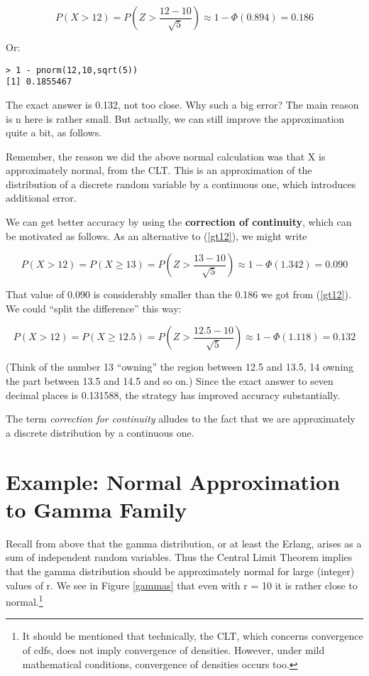 \begin{equation}
\label{gt12}
P(X > 12) = P(Z > \frac{12-10}{\sqrt{5}}) 
\approx 1 - \Phi(0.894) = 0.186
\end{equation}

Or:

\begin{Verbatim}[fontsize=\relsize{-2}]
> 1 - pnorm(12,10,sqrt(5))
[1] 0.1855467
\end{Verbatim}

The exact answer is 0.132, not too close.  Why such a big error?
The main reason is n here is rather small.  But actually, we can still
improve the approximation quite a bit, as follows.

Remember, the reason we did the above normal calculation was that X is
approximately normal, from the CLT.  This is an approximation of the
distribution of a discrete random variable by a continuous one, which
introduces additional error.

We can get better accuracy by using the {\bf correction of continuity},
which can be motivated as follows.  As an alternative to (\ref{gt12}),
we might write

\begin{equation}
P(X > 12) = P( X \geq 13) = P(Z > \frac{13-10}{\sqrt{5}}) 
\approx 1 - \Phi(1.342) = 0.090
\end{equation}

That value of 0.090 is considerably smaller than the 0.186 we got from
(\ref{gt12}).  We could ``split the difference'' this way:

\begin{equation}
P(X > 12) = P( X \geq 12.5) = P(Z > \frac{12.5-10}{\sqrt{5}}) 
\approx 1 - \Phi(1.118) = 0.132
\end{equation}

(Think of the number 13 ``owning'' the region between 12.5 and 13.5, 14
owning the part between 13.5 and 14.5 and so on.) Since the exact answer
to seven decimal places is 0.131588, the strategy has improved accuracy
substantially.  

The term {\it correction for continuity} alludes to the fact that we
are approximately a discrete distribution by a continuous one.

\section{Example:  Normal Approximation to Gamma Family}

Recall from above that the gamma distribution, or at least the Erlang,
arises as a sum of independent random variables.  Thus the Central Limit
Theorem implies that the gamma distribution should be approximately
normal for large (integer) values of r.  We see in Figure \ref{gammas}
that even with r = 10 it is rather close to normal.\footnote{It should
be mentioned that technically, the CLT, which concerns convergence of
cdfs, does not imply convergence of densities.  However, under mild
mathematical conditions, convergence of densities occurs too.}

